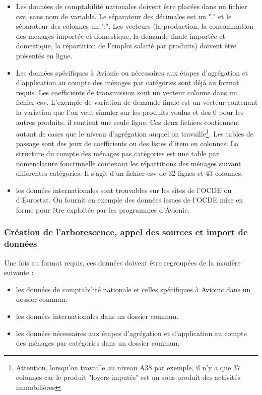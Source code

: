 \documentclass[a4paper,french,11pt]{article}
\begin{document}
\begin{itemize}

\item Les donn\'ees de comptabilit\'e nationales doivent \^etre plac\'ees dans un fichier csv, sans nom de variable. Le s\'eparateur des d\'ecimales est un "." et le s\'eparateur des colonnes un ";". Les vecteurs (la production, la consommation des m\'enages import\'ee et domestique, la demande finale import\'ee et domestique, la r\'epartition de l'emploi salari\'e par produits) doivent \^etre pr\'esent\'es en ligne.

\item Les donn\'ees sp\'ecifiques \`a Avionic ou n\'ecessaires aux \'etapes d'agr\'egation et d'application au compte des m\'enages par cat\'egories sont d\'ej\`a au format requis. Les coefficients de transmission sont un vecteur colonne dans un fichier csv.  L'exemple de variation de demande finale est un vecteur contenant la variation que l'on veut simuler sur les produits voulus et des 0 pour les autres produits, il contient une seule ligne. Ces deux fichiers contiennent autant de cases que le niveau d'agr\'egation auquel on travaille\footnote{Attention, lorsqu'on travaille au niveau A38 par exemple, il n'y a que 37 colonnes car le produit "loyers imput\'es" est un sous-produit des activit\'es immobili\`eres}. Les tables de passage sont des jeux de coefficients ou des listes d'item en colonnes. La structure du compte des m\'enages pas cat\'egories est une table par nomenclature fonctinnelle contenant les r\'epartitions des m\'enages suivant diff\'erentes cat\'egories. Il s'agit d'un fichier csv de 32 lignes et 43 colonnes.

\item les donn\'ees internationales sont trouvables sur les sites de l'OCDE ou d'Eurostat. On fournit en exemple des donn\'ees issues de l'OCDE mise en forme pour \^etre exploit\'ee par les programmes d'Avionic.

\end{itemize}

\subsubsection{Cr\'eation de l'arborescence, appel des sources et import de donn\'ees}

Une fois au format requis, ces donn\'ees doivent \^etre regroup\'ees de la mani\`ere suivante : 

\begin{itemize}

\item les donn\'ees de comptabilit\'e nationale et celles sp\'ecifiques \`a Avionic dans un dossier commun.
\item les donn\'ees internationales dans un dossier commun. 
\item les donn\'ees n\'ecessaires aux \'etapes d'agr\'egation et d'application au compte des m\'enages par cat\'egories dans un dossier commun.

\end{itemize}
\end{document}
